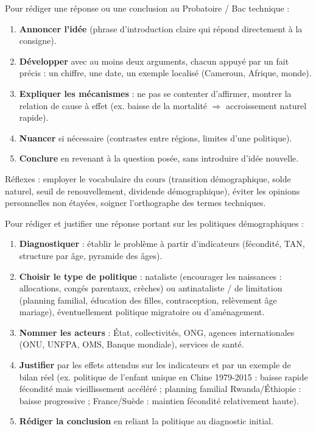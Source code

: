 \documentclass[11pt]{article}
\begin{document}
\begin{methode}
Pour rédiger une réponse ou une conclusion au Probatoire / Bac technique :
\begin{enumerate}
\item \textbf{Annoncer l'idée} (phrase d'introduction claire qui répond directement à la consigne).
\item \textbf{Développer} avec au moins deux arguments, chacun appuyé par un fait précis : un chiffre, une date, un exemple localisé (Cameroun, Afrique, monde).
\item \textbf{Expliquer les mécanismes} : ne pas se contenter d'affirmer, montrer la relation de cause à effet (ex. baisse de la mortalité $\Rightarrow$ accroissement naturel rapide).
\item \textbf{Nuancer} si nécessaire (contrastes entre régions, limites d'une politique).
\item \textbf{Conclure} en revenant à la question posée, sans introduire d'idée nouvelle.
\end{enumerate}
Réflexes : employer le vocabulaire du cours (transition démographique, solde naturel, seuil de renouvellement, dividende démographique), éviter les opinions personnelles non étayées, soigner l'orthographe des termes techniques.
\end{methode}

\begin{methode}
Pour rédiger et justifier une réponse portant sur les politiques démographiques :
\begin{enumerate}
\item \textbf{Diagnostiquer} : établir le problème à partir d'indicateurs (fécondité, TAN, structure par âge, pyramide des âges).
\item \textbf{Choisir le type de politique} : nataliste (encourager les naissances : allocations, congés parentaux, crèches) ou antinataliste / de limitation (planning familial, éducation des filles, contraception, relèvement âge mariage), éventuellement politique migratoire ou d'aménagement.
\item \textbf{Nommer les acteurs} : État, collectivités, ONG, agences internationales (ONU, UNFPA, OMS, Banque mondiale), services de santé.
\item \textbf{Justifier} par les effets attendus sur les indicateurs et par un exemple de bilan réel (ex. politique de l'enfant unique en Chine 1979-2015 : baisse rapide fécondité mais vieillissement accéléré ; planning familial Rwanda/Éthiopie : baisse progressive ; France/Suède : maintien fécondité relativement haute).
\item \textbf{Rédiger la conclusion} en reliant la politique au diagnostic initial.
\end{enumerate}
\end{methode}
\end{document}
